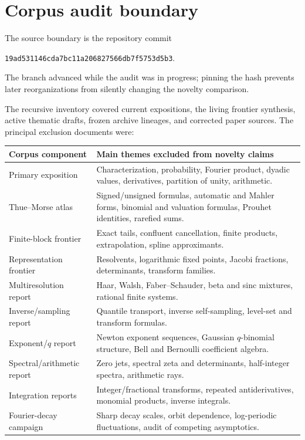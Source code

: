 \documentclass[11pt,oneside]{article}
\theoremstyle{definition}
\begin{document}
\appendix

\section{Corpus audit boundary}
\label{p2:app:corpus}

The source boundary is the repository commit
\begin{center}
\nolinkurl{19ad531146cda7bc11a206827566db7f5753d5b3}.
\end{center}
The branch advanced while the audit was in progress; pinning the hash prevents
later reorganizations from silently changing the novelty comparison.

The recursive inventory covered current expositions, the living frontier
synthesis, active thematic drafts, frozen archive lineages, and corrected
paper sources.  The principal exclusion documents were:
\begin{center}
\small
\begin{tabularx}{0.96\textwidth}{@{}p{}X@{}}
\toprule
Corpus component & Main themes excluded from novelty claims\\
\midrule
Primary exposition & Characterization, probability, Fourier product, dyadic values, derivatives, partition of unity, arithmetic.\\
Thue--Morse atlas & Signed/unsigned formulas, automatic and Mahler forms, binomial and valuation formulas, Prouhet identities, rarefied sums.\\
Finite-block frontier & Exact tails, confluent cancellation, finite products, extrapolation, spline approximants.\\
Representation frontier & Resolvents, logarithmic fixed points, Jacobi fractions, determinants, transform families.\\
Multiresolution report & Haar, Walsh, Faber--Schauder, beta and sinc mixtures, rational finite systems.\\
Inverse/sampling report & Quantile transport, inverse self-sampling, level-set and transform formulas.\\
Exponent/$q$ report & Newton exponent sequences, Gaussian $q$-binomial structure, Bell and Bernoulli coefficient algebra.\\
Spectral/arithmetic report & Zero jets, spectral zeta and determinants, half-integer spectra, arithmetic rays.\\
Integration reports & Integer/fractional transforms, repeated antiderivatives, monomial products, inverse integrals.\\
Fourier-decay campaign & Sharp decay scales, orbit dependence, log-periodic fluctuations, audit of competing asymptotics.\\
\bottomrule
\end{tabularx}
\end{center}
\end{document}
